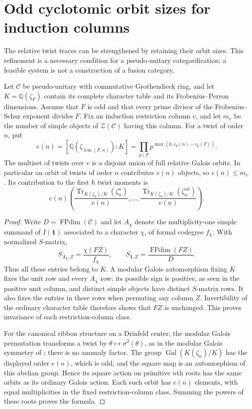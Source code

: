 \section{Odd cyclotomic orbit sizes for induction columns}
\label{sec:odd-column-orbits}
The relative twist traces can be strengthened by retaining their orbit sizes.
This refinement is a necessary condition for a pseudo-unitary categorification;
a feasible system is not a construction of a fusion category.

\begin{proposition}\label{prop:odd-column-orbits}
Let $\mathcal C$ be pseudo-unitary with commutative Grothendieck ring, and let
$K=\mathbb Q(\zeta_F)$ contain its complete character table and its Frobenius--Perron dimensions.
Assume that $F$ is odd and that every prime divisor of the Frobenius--Schur
exponent divides $F$.  Fix an induction restriction column $v$, and let $m_v$
be the number of simple objects of $\mathcal Z(\mathcal C)$ having this column.
For a twist of order $n$, put
\[
 e(n)=[\mathbb Q(\zeta_{\operatorname{lcm}(F,n)}):K]
      =\prod_{p\mid F}p^{\max(0,v_p(n)-v_p(F))}.
\]
The multiset of twists over $v$ is a disjoint union of full relative Galois
orbits.  In particular an orbit of twists of order $n$ contributes $e(n)$
objects, so $e(n)\le m_v$.  Its contribution to the first $h$ twist moments is
\[
 e(n)\left(\frac{\operatorname{Tr}_{K(\zeta_n)/K}(\zeta_n^a)}{e(n)},\ldots,
 \frac{\operatorname{Tr}_{K(\zeta_n)/K}(\zeta_n^{ah})}{e(n)}\right).
\]
\end{proposition}

\begin{proof}
Write $D=\operatorname{FPdim}(\mathcal C)$ and let $A_\chi$ denote the
multiplicity-one simple summand of $I(\mathbf1)$ associated to a character
$\chi$, of formal codegree $f_\chi$.  With normalized $S$-matrix,
\[
 S_{A_\chi,Z}=\frac{\chi(FZ)}{f_\chi},\qquad
 S_{\mathbf1,Z}=\frac{\operatorname{FPdim}(FZ)}{D}.
\]
Thus all these entries belong to $K$.  A modular Galois automorphism fixing
$K$ fixes the unit row and every $A_\chi$ row: its possible sign is positive,
as seen in the positive unit column, and distinct simple objects have
 distinct $S$-matrix rows.  It also fixes the entries in these rows when
permuting any column $Z$.  Invertibility of the ordinary character table
therefore shows that $FZ$ is unchanged.  This proves invariance of each
restriction-column class.

For the canonical ribbon structure on a Drinfeld center, the modular Galois
permutation transforms a twist by $\theta\mapsto\sigma^2(\theta)$, as in the modular Galois symmetry of \cite{BNRW}; there is
no anomaly factor.  The group
$\operatorname{Gal}(K(\zeta_n)/K)$ has the displayed order $e(n)$, which is
odd, and the square map is an automorphism of this abelian group.  Hence its
square action on primitive $n$th roots has the same orbits as its ordinary
Galois action.  Each such orbit has $e(n)$ elements, with equal
multiplicities in the fixed restriction-column class.  Summing the powers
of these roots proves the formula.
\end{proof}


